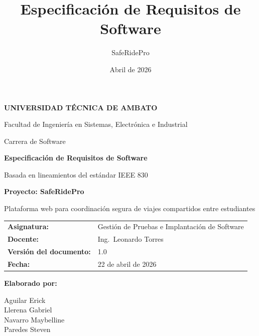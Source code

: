 \documentclass[12pt]{article}
\title{Especificaci\'on de Requisitos de Software}
\author{SafeRidePro}
\date{Abril de 2026}
\begin{document}
\onehalfspacing
{}

\begin{titlepage}
    \centering
    \vspace*{-3.5cm}


    \vspace{1.2cm}

    {\Large \textbf{UNIVERSIDAD T\'ECNICA DE AMBATO}\par}
    \vspace{0.2cm}
    {\normalsize Facultad de Ingenier\'ia en Sistemas, Electr\'onica e Industrial\par}
    {\normalsize Carrera de Software\par}

    \vspace{1.5cm}

    {\LARGE \textbf{Especificaci\'on de Requisitos de Software}\par}
    \vspace{0.4cm}
    {\Large Basada en lineamientos del est\'andar IEEE 830\par}

    \vspace{1.0cm}

    {\Large \textbf{Proyecto: SafeRidePro}\par}
    \vspace{0.3cm}
    {\normalsize Plataforma web para coordinaci\'on segura de viajes compartidos entre estudiantes\par}

    \vfill

    \begin{tabular}{P{5cm}P{8cm}}
        \textbf{Asignatura:} & Gesti\'on de Pruebas e Implantaci\'on de Software \\
        \textbf{Docente:} & Ing.\ Leonardo Torres \\
        \textbf{Versi\'on del documento:} & 1.0 \\
        \textbf{Fecha:} & 22 de abril de 2026 \\
    \end{tabular}

    \vspace{1.2cm}

    \textbf{Elaborado por:}

    \vspace{0.3cm}

    Aguilar Erick\\
    Llerena Gabriel\\
    Navarro Maybelline\\
    Paredes Steven

    \vfill
\end{titlepage}
\end{document}

